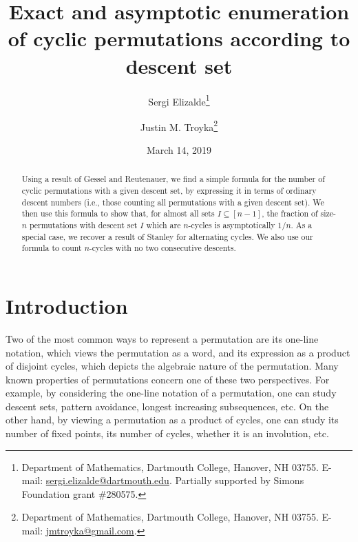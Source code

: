 \documentclass[12pt]{article}
\theoremstyle{definition}
\begin{document}
\title{Exact and asymptotic enumeration of cyclic permutations according to descent set}
\date{March 14, 2019}
\author{Sergi Elizalde\thanks{Department of Mathematics,
Dartmouth College, Hanover, NH 03755. E-mail: \url{sergi.elizalde@dartmouth.edu}. Partially supported by Simons Foundation grant \#280575.}
\and Justin M. Troyka\thanks{Department of Mathematics,
Dartmouth College, Hanover, NH 03755. E-mail: \url{jmtroyka@gmail.com}.}}
\maketitle

\begin{abstract}
Using a result of Gessel and Reutenauer, we find a simple formula for the number of cyclic permutations with a given descent set, by expressing it in terms of ordinary descent numbers (i.e., those counting all permutations with a given descent set). We then use this formula to show that, for almost all sets $I \subseteq [n-1]$, the fraction of size-$n$ permutations with descent set $I$ which are $n$-cycles is asymptotically $1/n$. As a special case, we recover a result of Stanley for alternating cycles. We also use our formula to count $n$-cycles with no two consecutive descents.
\end{abstract}


\section{Introduction} \label{Introduction}

Two of the most common ways to represent a permutation are its one-line notation, which views the permutation as a word,
and its expression as a product of disjoint cycles, which depicts the algebraic nature of the permutation.
Many known properties of permutations concern one of these two perspectives.
For example, by considering the one-line notation of a permutation, one can study descent sets, pattern avoidance, longest increasing subsequences, etc.
On the other hand, by viewing a permutation as a product of cycles, one can study its number of fixed points, its number of cycles, whether it is an involution, etc.
\end{document}
